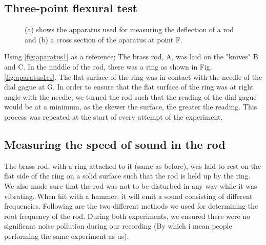 \documentclass[11pt,a4paper]{article}
\begin{document}
  \subsection{Three-point flexural test}

    \begin{figure}[H]
      \centering
      \center
      \caption{(a) shows the apparatus used for measuring the deflection of a rod and (b) a cross section of the  aparatus at point F.}
      \label{fig:exp_1}
    \end{figure}

    Using \ref{fig:aparatus1} as a reference; The brass rod, A, was laid on the "knives" B and C. In the middle of the rod, there was a ring as shown in Fig. \ref{fig:aparatus1cs}. The flat surface of the ring was in contact with the needle of the dial gague at G. In order to ensure that the flat surface of the ring was at right angle with the needle, we turned the rod such that the reading of the dial gague would be at a minimum, as the skewer the surface, the greater the reading. This process was repeated at the start of every attempt of the experiment.
    
  \subsection{Measuring the speed of sound in the rod}
      The brass rod, with a ring attached to it (same as before), was laid to rest on the flat side of the ring on a solid surface such that the rod is held up by the ring. We also made sure that the rod was not to be disturbed in any way while it was vibrating. When hit with a hammer, it will emit a sound consisting of different frequencies. Following are the two different methods we used for determining the root frequency of the rod.
      During both experiments, we ensured there were no significant noise pollution during our recording (By which i mean people performing the same experiment as us).
\end{document}
